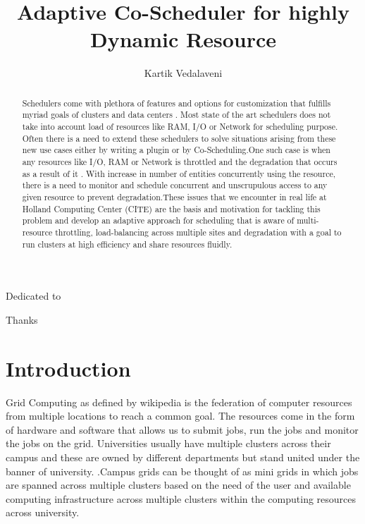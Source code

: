 \documentclass[ms,electronic,double]{nuthesis}
\begin{document}
\frontmatter
\title{Adaptive Co-Scheduler for highly Dynamic Resource}
\author{Kartik Vedalaveni}
\maketitle

\begin{abstract}
Schedulers come with plethora of features and 
options for customization that fulfills myriad goals of  
clusters and data centers . Most state of the art schedulers does not take into account load of resources 
like RAM, I/O or Network for scheduling purpose. Often there is a need to extend these schedulers to solve 
situations arising from these new use cases either by writing a plugin or by Co-Scheduling.One such 
case is when any resources like I/O, RAM or Network is
throttled and the degradation that occurs as a result of it . With increase in number of entities concurrently 
using the resource, there is a 
need to monitor and schedule concurrent and unscrupulous access to any given resource to prevent 
degradation.These issues that we encounter in real life at Holland Computing Center (CITE) are the 
basis and motivation for tackling this problem and develop an adaptive approach for scheduling 
that is aware of multi-resource throttling, load-balancing across multiple sites and degradation 
with a goal to run clusters at high efficiency and share resources fluidly. 
\end{abstract}

\begin{dedication}
Dedicated to 
\end{dedication}

\begin{acknowledgments}
Thanks
\end{acknowledgments}

\tableofcontents
\newpage
\listoffigures
\listoftables


\mainmatter

\chapter{Introduction}
Grid Computing as defined by wikipedia is the federation of computer resources from multiple locations
to reach a common goal. The resources come in the form of hardware 
and software that allows us to submit jobs, run the jobs and monitor the jobs on the grid. 
Universities usually have multiple clusters across their campus and these are 
owned by different departments but stand united under the banner of university. 
.Campus grids can be thought of as mini grids in which jobs are spanned across multiple clusters
 based on the need of the user and available computing infrastructure 
across multiple clusters within the computing resources across university.
\end{document}
